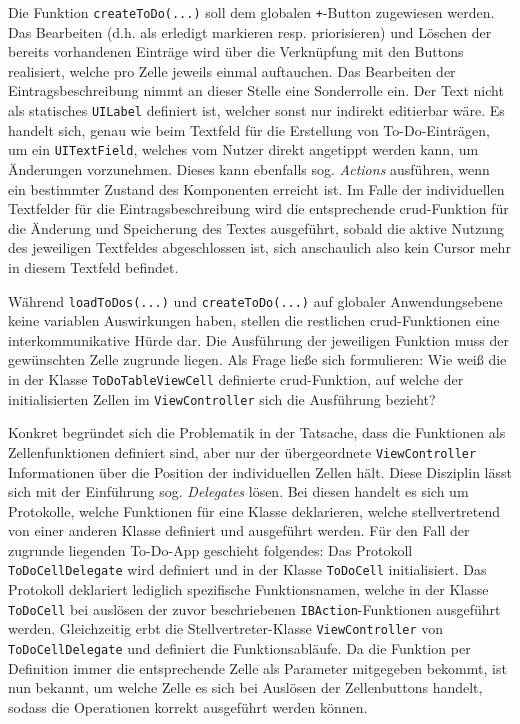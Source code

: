 Die Funktion \texttt{createToDo(...)} soll dem globalen \texttt{+}-Button zugewiesen werden. Das Bearbeiten (d.h. als erledigt markieren resp. priorisieren) und Löschen der bereits vorhandenen Einträge wird über die Verknüpfung mit den Buttons realisiert, welche pro Zelle jeweils einmal auftauchen. Das Bearbeiten der Eintragsbeschreibung nimmt an dieser Stelle eine Sonderrolle ein. Der Text nicht als statisches \texttt{UILabel} definiert ist, welcher sonst nur indirekt editierbar wäre. Es handelt sich, genau wie beim Textfeld für die Erstellung von To-Do-Einträgen, um ein \texttt{UITextField}, welches vom Nutzer direkt angetippt werden kann, um Änderungen vorzunehmen. Dieses kann ebenfalls sog. \textit{Actions} ausführen, wenn ein bestimmter Zustand des Komponenten erreicht ist. Im Falle der individuellen Textfelder für die Eintragsbeschreibung wird die entsprechende \ac{crud}-Funktion für die Änderung und Speicherung des Textes ausgeführt, sobald die aktive Nutzung des jeweiligen Textfeldes abgeschlossen ist, sich anschaulich also kein Cursor mehr in diesem Textfeld befindet.

Während \texttt{loadToDos(...)} und \texttt{createToDo(...)} auf globaler Anwendungsebene keine variablen Auswirkungen haben, stellen die restlichen \ac{crud}-Funktionen eine interkommunikative Hürde dar. Die Ausführung der jeweiligen Funktion muss der gewünschten Zelle zugrunde liegen. Als Frage ließe sich formulieren: Wie weiß die in der Klasse \texttt{ToDoTableViewCell} definierte \ac{crud}-Funktion, auf welche der initialisierten Zellen im \texttt{ViewController} sich die Ausführung bezieht?

Konkret begründet sich die Problematik in der Tatsache, dass die Funktionen als Zellenfunktionen definiert sind, aber nur der übergeordnete \texttt{ViewController} Informationen über die Position der individuellen Zellen hält. Diese Disziplin lässt sich mit der Einführung sog. \textit{Delegates} lösen. Bei diesen handelt es sich um Protokolle, welche Funktionen für eine Klasse deklarieren, welche stellvertretend von einer anderen Klasse definiert und ausgeführt werden. Für den Fall der zugrunde liegenden To-Do-App geschieht folgendes: Das Protokoll \texttt{ToDoCellDelegate} wird definiert und in der Klasse \texttt{ToDoCell} initialisiert. Das Protokoll deklariert lediglich spezifische Funktionsnamen, welche in der Klasse \texttt{ToDoCell} bei auslösen der zuvor beschriebenen \texttt{IBAction}-Funktionen ausgeführt werden. Gleichzeitig erbt die Stellvertreter-Klasse \texttt{ViewController} von \texttt{ToDoCellDelegate} und definiert die Funktionsabläufe. Da die Funktion per Definition immer die entsprechende Zelle als Parameter mitgegeben bekommt, ist nun bekannt, um welche Zelle es sich bei Auslösen der Zellenbuttons handelt, sodass die Operationen korrekt ausgeführt werden können.

